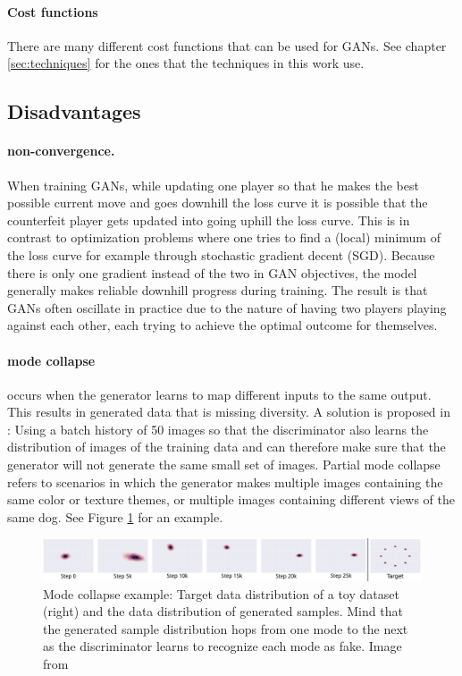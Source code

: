 \paragraph{Cost functions} There are many different cost functions that can be used for GANs. See chapter \ref{sec:techniques} for the ones that the techniques in this work use.


\subsection{Disadvantages}
\paragraph{non-convergence.} When training GANs, while updating one player so that he makes the best possible current move and goes downhill the loss curve it is possible that the counterfeit player gets updated into going uphill the loss curve. This is in contrast to optimization problems where one tries to find a (local) minimum of the loss curve for example through stochastic gradient decent (SGD). Because there is only one gradient instead of the two in GAN objectives, the model generally makes reliable downhill progress during training. The result is that GANs often oscillate in practice due to the nature of having two players playing against each other, each trying to achieve the optimal outcome for themselves.

\paragraph{mode collapse} occurs when the generator learns to map different inputs to the same output. This results in generated data that is missing diversity. A solution is proposed in \cite{DBLP:journals/corr/ZhuPIE17}: Using a batch history of 50 images so that the discriminator also learns the distribution of images of the training data and can therefore make sure that the generator will not generate the same small set of images. Partial mode collapse refers to scenarios in which the generator makes multiple images containing the same color or texture themes, or multiple images containing different views of the same dog. See Figure \ref{fig:mode_collapse} for an example.

\begin{figure}
	\centering
	\includegraphics[width=\textwidth]{images/metz_et_al_mode_collapse.png}
	\caption{Mode collapse example: Target data distribution of a toy dataset (right) and the data distribution of generated samples. Mind that the generated sample distribution hops from one mode to the next as the discriminator learns to recognize each mode as fake. Image from \cite{DBLP:journals/corr/MetzPPS16}}
	\label{fig:mode_collapse}
\end{figure}

